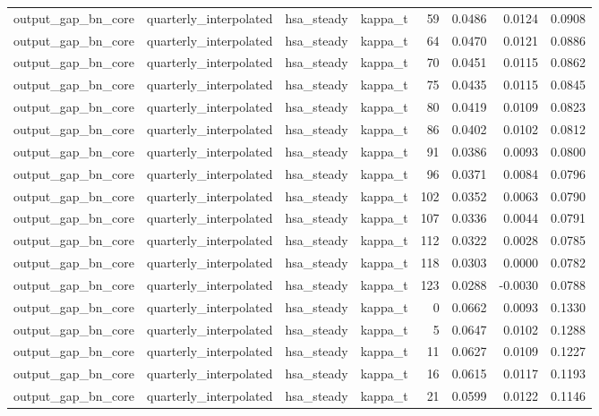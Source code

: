 \begin{tabular}{llllrrrr}
output\_gap\_bn\_core & quarterly\_interpolated & hsa\_steady & kappa\_t & 59 & 0.0486 & 0.0124 & 0.0908 \\
output\_gap\_bn\_core & quarterly\_interpolated & hsa\_steady & kappa\_t & 64 & 0.0470 & 0.0121 & 0.0886 \\
output\_gap\_bn\_core & quarterly\_interpolated & hsa\_steady & kappa\_t & 70 & 0.0451 & 0.0115 & 0.0862 \\
output\_gap\_bn\_core & quarterly\_interpolated & hsa\_steady & kappa\_t & 75 & 0.0435 & 0.0115 & 0.0845 \\
output\_gap\_bn\_core & quarterly\_interpolated & hsa\_steady & kappa\_t & 80 & 0.0419 & 0.0109 & 0.0823 \\
output\_gap\_bn\_core & quarterly\_interpolated & hsa\_steady & kappa\_t & 86 & 0.0402 & 0.0102 & 0.0812 \\
output\_gap\_bn\_core & quarterly\_interpolated & hsa\_steady & kappa\_t & 91 & 0.0386 & 0.0093 & 0.0800 \\
output\_gap\_bn\_core & quarterly\_interpolated & hsa\_steady & kappa\_t & 96 & 0.0371 & 0.0084 & 0.0796 \\
output\_gap\_bn\_core & quarterly\_interpolated & hsa\_steady & kappa\_t & 102 & 0.0352 & 0.0063 & 0.0790 \\
output\_gap\_bn\_core & quarterly\_interpolated & hsa\_steady & kappa\_t & 107 & 0.0336 & 0.0044 & 0.0791 \\
output\_gap\_bn\_core & quarterly\_interpolated & hsa\_steady & kappa\_t & 112 & 0.0322 & 0.0028 & 0.0785 \\
output\_gap\_bn\_core & quarterly\_interpolated & hsa\_steady & kappa\_t & 118 & 0.0303 & 0.0000 & 0.0782 \\
output\_gap\_bn\_core & quarterly\_interpolated & hsa\_steady & kappa\_t & 123 & 0.0288 & -0.0030 & 0.0788 \\
output\_gap\_bn\_core & quarterly\_interpolated & hsa\_steady & kappa\_t & 0 & 0.0662 & 0.0093 & 0.1330 \\
output\_gap\_bn\_core & quarterly\_interpolated & hsa\_steady & kappa\_t & 5 & 0.0647 & 0.0102 & 0.1288 \\
output\_gap\_bn\_core & quarterly\_interpolated & hsa\_steady & kappa\_t & 11 & 0.0627 & 0.0109 & 0.1227 \\
output\_gap\_bn\_core & quarterly\_interpolated & hsa\_steady & kappa\_t & 16 & 0.0615 & 0.0117 & 0.1193 \\
output\_gap\_bn\_core & quarterly\_interpolated & hsa\_steady & kappa\_t & 21 & 0.0599 & 0.0122 & 0.1146 \\

\end{tabular}
